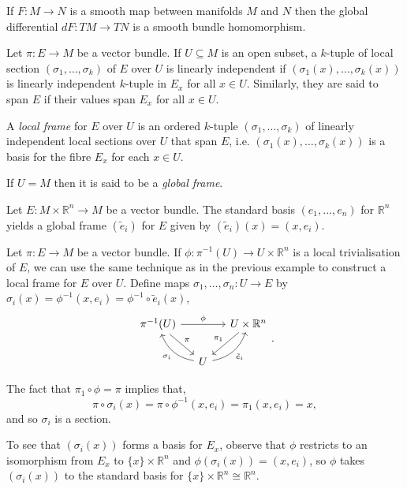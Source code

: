 \begin{example}
If $F:M\to N$ is a smooth map between manifolds $M$ and $N$ then the global differential $dF:TM\to TN$ is a smooth bundle homomorphism.
\end{example}

Let $\pi:E\to M$ be a vector bundle. If $U\subseteq M$ is an open subset, a $k$-tuple of local section $(\sigma_1,\ldots,\sigma_k)$ of $E$ over $U$ is linearly independent if $(\sigma_1(x),\ldots,\sigma_k(x))$ is linearly independent $k$-tuple in $E_x$ for all $x\in U$. Similarly, they are said to span $E$ if their values span $E_x$ for all $x\in U$.

\begin{definition}
A \textit{local frame} for $E$ over $U$ is an ordered $k$-tuple $(\sigma_1,\ldots,\sigma_k)$ of linearly independent local sections over $U$ that span $E$, i.e. $(\sigma_1(x),\ldots,\sigma_k(x))$ is a basis for the fibre $E_x$ for each $x\in U$.

If $U=M$ then it is said to be a \textit{global frame}.
\end{definition}
\begin{example}
Let $E:M\times\mathbb{R}^n\to M$ be a vector bundle. The standard basis $(e_1,\ldots,e_n)$ for $\mathbb{R}^n$ yields a global frame $(\tilde{e}_i)$ for $E$ given by $(\tilde{e}_i)(x)=(x,e_i)$.
\end{example}
\begin{example}
Let $\pi:E\to M$ be a vector bundle. If $\phi:\pi^{-1}(U)\to U\times \mathbb{R}^n$ is a local trivialisation of $E$, we can use the same technique as in the previous example to construct a local frame for $E$ over $U$. Define maps $\sigma_1,\ldots,\sigma_n: U\to E$ by $\sigma_i(x)=\phi^{-1}(x,e_i)=\phi^{-1}\circ\tilde{e}_i(x)$,
\[
\begin{tikzcd}[column sep=small]
\pi^{-1}(U) \arrow{dr}{\pi} \arrow{rr}{\phi} && U\times\mathbb{R}^n \arrow{dl}[swap]{\pi_1}\\
&U \arrow[ul, bend left, "\sigma_i"] \arrow[ur, bend right,swap,"\tilde{e}_i"]
\end{tikzcd}.
\]

The fact that $\pi_1\circ\phi=\pi$ implies that,
\[
\pi\circ\sigma_i(x)=\pi\circ\phi^{-1}(x,e_i)=\pi_1(x,e_i)=x,
\]
and so $\sigma_i$ is a section.

To see that $(\sigma_i(x))$ forms a basis for $E_x$, observe that $\phi$ restricts to an isomorphism from $E_x$ to $\{x\}\times\mathbb{R}^n$ and $\phi(\sigma_i(x))=(x,e_i)$, so $\phi$ takes $(\sigma_i(x))$ to the standard basis for $\{x\}\times\mathbb{R}^n\cong\mathbb{R}^n$.
\end{example}
